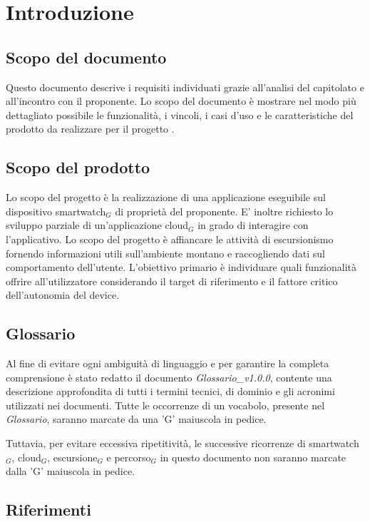 \section{Introduzione}
\subsection{Scopo del documento}
Questo documento descrive i requisiti individuati grazie all'analisi del capitolato e all'incontro con il proponente. Lo scopo del documento è mostrare nel modo più dettagliato possibile le funzionalità, i vincoli, i casi d'uso e le caratteristiche del prodotto da realizzare per il progetto \CAPITOLATO{}.

\subsection{Scopo del prodotto}
Lo scopo del progetto è la realizzazione di una applicazione eseguibile sul dispositivo smartwatch$_{G}$ di proprietà del proponente. E’ inoltre richiesto lo sviluppo parziale di un’applicazione cloud$_{G}$ in grado di interagire con l’applicativo. Lo scopo del progetto è affiancare le attività di escursionismo fornendo informazioni utili sull’ambiente montano e raccogliendo dati sul comportamento dell’utente. L’obiettivo primario è individuare quali funzionalità offrire all’utilizzatore considerando il target di riferimento e il fattore critico dell’autonomia del device.

\subsection{Glossario}
Al fine di evitare ogni ambiguità di linguaggio e per garantire la completa comprensione è stato redatto il documento \textit{Glossario\_v1.0.0}, contente una descrizione approfondita di tutti i termini tecnici, di dominio e gli acronimi utilizzati nei documenti. Tutte le occorrenze di un vocabolo, presente nel \textit{Glossario}, saranno marcate da una 'G' maiuscola in pedice.

Tuttavia, per evitare eccessiva ripetitività, le successive ricorrenze di smartwatch$_{G}$, cloud$_{G}$, escursione$_{G}$ e percorso$_{G}$ in questo documento non saranno marcate dalla 'G' maiuscola in pedice.


\subsection{Riferimenti}
